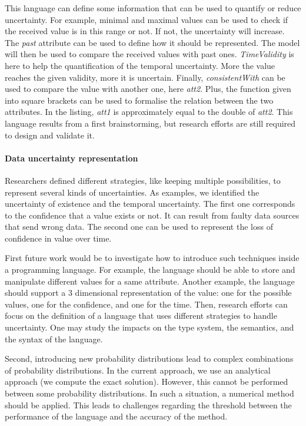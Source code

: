 This language can define some information that can be used to quantify or reduce uncertainty.
For example, minimal and maximal values can be used to check if the received value is in this range or not.
If not, the uncertainty will increase.
The \textit{past} attribute can be used to define how it should be represented.
The model will then be used to compare the received values with past ones.
\textit{TimeValidity} is here to help the quantification of the temporal uncertainty.
More the value reaches the given validity, more it is uncertain.
Finally, \textit{consistentWith} can be used to compare the value with another one, here \textit{att2}.
Plus, the function given into square brackets can be used to formalise the relation between the two attributes.
In the listing, \textit{att1} is approximately equal to the double of \textit{att2}.
This language results from a first brainstorming, but research efforts are still required to design and validate it.

\paragraph{Data uncertainty representation}
Researchers defined different strategies, like keeping multiple possibilities, to represent several kinds of uncertainties.
As examples, we identified the uncertainty of existence and the temporal uncertainty.
The first one corresponds to the confidence that a value exists or not.
It can result from faulty data sources that send wrong data.
The second one can be used to represent the loss of confidence in value over time.

First future work would be to investigate how to introduce such techniques inside a programming language.
For example, the language should be able to store and manipulate different values for a same attribute.
Another example, the language should support a 3 dimensional representation of the value: one for the possible values, one for the confidence, and one for the time.
Then, research efforts can focus on the definition of a language that uses different strategies to handle uncertainty.
One may study the impacts on the type system, the semantics, and the syntax of the language.

Second, introducing new probability distributions lead to complex combinations of probability distributions.
In the current approach, we use an analytical approach (we compute the exact solution).
However, this cannot be performed between some probability distributions.
In such a situation, a numerical method should be applied.
This leads to challenges regarding the threshold between the performance of the language and the accuracy of the method.

